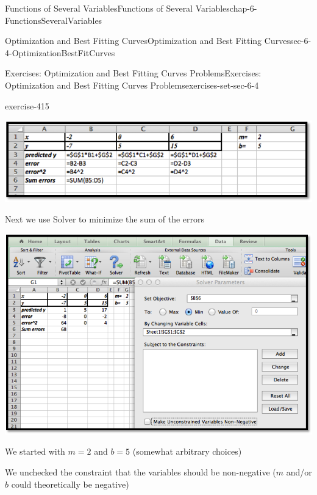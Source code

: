 \documentclass[oneside,10pt,]{book}
\numberwithin{equation}{section}
\begin{document}
\begin{chapterptx}{Functions of Several Variables}{}{Functions of Several Variables}{}{}{chap-6-FunctionsSeveralVariables}
\begin{sectionptx}{Optimization and Best Fitting Curves}{}{Optimization and Best Fitting Curves}{}{}{sec-6-4-OptimizationBestFitCurves}
\begin{exercises-subsection-numberless}{Exercises: Optimization and Best Fitting Curves Problems}{}{Exercises: Optimization and Best Fitting Curves Problems}{}{}{exercises-set-sec-6-4}
\begin{divisionexercise}{1}{}{}{exercise-415}
\begin{sidebyside}{1}{0.1}{0.1}{0}
\begin{sbspanel}{0.8}
\includegraphics[width=1\linewidth]{images/sec6-4-sol1b.png}
\end{sbspanel}%
\end{sidebyside}%
\par
\hypertarget{p-2488}{}%
Next we use Solver to minimize the sum of the errors%
\begin{sidebyside}{1}{0}{0}{0}%
\begin{sbspanel}{1}%
\includegraphics[width=1\linewidth]{images/sec6-4-sol1c.png}
\end{sbspanel}%
\end{sidebyside}%
\par
\hypertarget{p-2489}{}%
We started with \(m=2\) and \(b=5\) (somewhat arbitrary choices)%
\par
\hypertarget{p-2490}{}%
We unchecked the constraint that the variables should be non-negative (\(m\) and\slash{}or \(b\) could theoretically be negative)%
\begin{sidebyside}{1}{0.2}{0.2}{0}%
\begin{sbspanel}{0.6}%

\end{sbspanel}
\end{sidebyside}
\end{divisionexercise}
\end{exercises-subsection-numberless}
\end{sectionptx}
\end{chapterptx}
\end{document}
